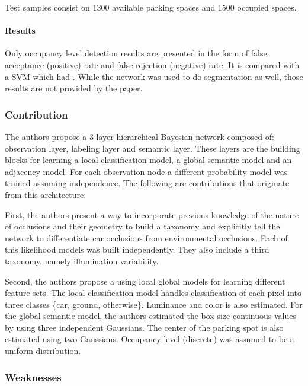 \documentclass[]{article}
\let\oldparagraph\paragraph
\renewcommand{\paragraph}[1]{\oldparagraph{#1}\mbox{}}
\begin{document}
Test samples consist on 1300 available parking spaces and 1500 occupied spaces.

\hypertarget{results}{%
\paragraph{Results}\label{results}}

Only occupancy level detection results are presented in the form of false acceptance (positive) rate and false rejection (negative) rate. It is compared with a SVM which had . While the network was used to do segmentation as well, those results are not provided by the paper.

\hypertarget{contribution}{%
\subsubsection{Contribution}\label{contribution}}

The authors propose a 3 layer hierarchical Bayesian network composed of: observation layer, labeling layer and semantic layer. These layers are the building blocks for learning a local classification model, a global semantic model and an adjacency model. For each observation node a different probability model was trained assuming independence. The following are contributions that originate from this architecture:

First, the authors present a way to incorporate previous knowledge of the nature of occlusions and their geometry to build a taxonomy and explicitly tell the network to differentiate car occlusions from environmental occlusions. Each of this likelihood models was built independently. They also include a third taxonomy, namely illumination variability.

Second, the authors propose a using local global models for learning different feature sets. The local classification model handles classification of each pixel into three classes \{car, ground, otherwise\}. Luminance and color is also estimated. For the global semantic model, the authors estimated the box size continuous values by using three independent Gaussians. The center of the parking spot is also estimated using two Gaussians. Occupancy level (discrete) was assumed to be a uniform distribution.

\hypertarget{weaknesses}{%
\subsubsection{Weaknesses}\label{weaknesses}}
\end{document}
